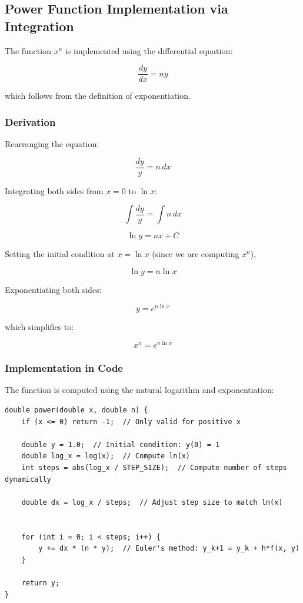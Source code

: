 \documentclass{article}
\begin{document}
\subsection{Power Function Implementation via Integration}
The function $x^n$ is implemented using the differential equation:

\begin{equation}
    \frac{dy}{dx} = n y
\end{equation}

which follows from the definition of exponentiation. 

\subsubsection{Derivation}
Rearranging the equation:

\begin{equation}
    \frac{dy}{y} = n \, dx
\end{equation}

Integrating both sides from $x = 0$ to $\ln x$:

\begin{equation}
    \int \frac{dy}{y} = \int n \, dx
\end{equation}

\begin{equation}
    \ln y = n x + C
\end{equation}

Setting the initial condition at $x = \ln x$ (since we are computing $x^n$),

\begin{equation}
    \ln y = n \ln x
\end{equation}

Exponentiating both sides:

\begin{equation}
    y = e^{n \ln x}
\end{equation}

which simplifies to:

\begin{equation}
    x^n = e^{n \ln x}
\end{equation}

\subsubsection{Implementation in Code}
The function is computed using the natural logarithm and exponentiation:

\begin{verbatim}
double power(double x, double n) {
    if (x <= 0) return -1;  // Only valid for positive x

    double y = 1.0;  // Initial condition: y(0) = 1
    double log_x = log(x);  // Compute ln(x)
    int steps = abs(log_x / STEP_SIZE);  // Compute number of steps dynamically

    double dx = log_x / steps;  // Adjust step size to match ln(x)


    for (int i = 0; i < steps; i++) {
        y += dx * (n * y);  // Euler's method: y_k+1 = y_k + h*f(x, y)
    }

    return y;
}
\end{verbatim}
\end{document}
